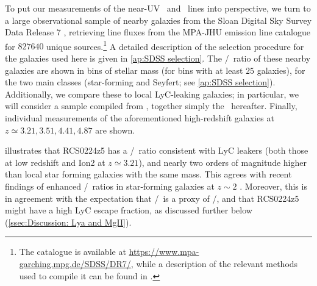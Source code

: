 To put our measurements of the near-UV \NeIII\ and \OII\ lines into perspective, we turn to a large observational sample of nearby galaxies from the Sloan Digital Sky Survey Data Release 7 \citep[SDSS DR7;][]{2009ApJS..182..543A}, retrieving line fluxes from the MPA-JHU emission line catalogue for $\num[group-separator={,}]{827640}$ unique sources.\footnote{The catalogue is available at \url{https://www.mpa-garching.mpg.de/SDSS/DR7/}, while a description of the relevant methods used to compile it can be found in \citet{2004ApJ...613..898T}.} A detailed description of the selection procedure for the galaxies used here is given in \cref{ap:SDSS selection}. The \NeIII/\OII\ ratio of these nearby galaxies are shown in bins of stellar mass (for bins with at least $25$ galaxies), for the two main classes (star-forming and Seyfert; see \cref{ap:SDSS selection}). Additionally, we compare these to local LyC-leaking galaxies; in particular, we will consider a sample compiled from \citet{2016MNRAS.461.3683I, 2016Natur.529..178I, 2018MNRAS.474.4514I, 2018MNRAS.478.4851I, 2020A&A...639A..85G, 2020MNRAS.497.4293G}, together simply the \Isample\ hereafter. Finally, individual measurements of the aforementioned high-redshift galaxies at $z \simeq 3.21, 3.51, 4.41, 4.87$ \citep[, respectively]{2020MNRAS.491.1093V, 2012MNRAS.427.1953C, 2017ApJ...846L..30S, 2014A&A...563A..58T} are shown.

 illustrates that RCS0224z5 has a \NeIII/\OII\ ratio consistent with LyC leakers (both those at low redshift and Ion2 at $z \simeq 3.21$), and nearly two orders of magnitude higher than local star forming galaxies with the same mass. This agrees with recent findings of enhanced \NeIII/\OII\ ratios in star-forming galaxies at $z \sim 2$ \citep{2015ApJ...798...29Z, 2020ApJ...902L..16J}. Moreover, this is in agreement with the expectation that \NeIII/\OII\ is a proxy of \OIIIf/\OII, and that RCS0224z5 might have a high LyC escape fraction, as discussed further below (\cref{ssec:Discussion: Lya and MgII}).

